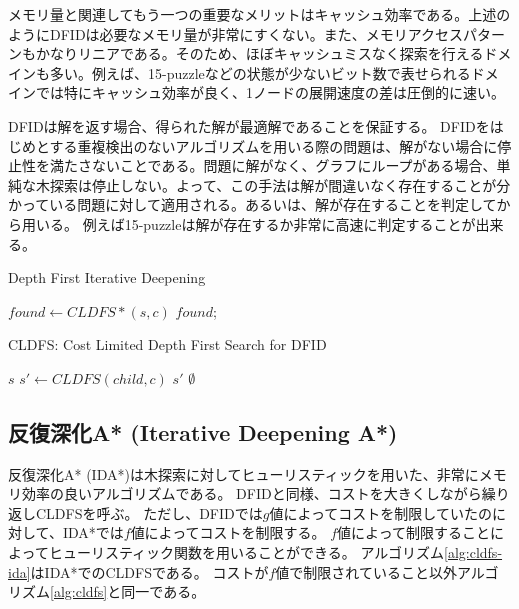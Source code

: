 \documentclass[10pt]{book}
\begin{document}
メモリ量と関連してもう一つの重要なメリットはキャッシュ効率である。上述のようにDFIDは必要なメモリ量が非常にすくない。また、メモリアクセスパターンもかなりリニアである。そのため、ほぼキャッシュミスなく探索を行えるドメインも多い。例えば、15-puzzleなどの状態が少ないビット数で表せられるドメインでは特にキャッシュ効率が良く、1ノードの展開速度の差は圧倒的に速い\cite{korf:85a}。

DFIDは解を返す場合、得られた解が最適解であることを保証する。
DFIDをはじめとする重複検出のないアルゴリズムを用いる際の問題は、解がない場合に停止性を満たさないことである。問題に解がなく、グラフにループがある場合、単純な木探索は停止しない。よって、この手法は解が間違いなく存在することが分かっている問題に対して適用される。あるいは、解が存在することを判定してから用いる。
例えば15-puzzleは解が存在するか非常に高速に判定することが出来る。

\begin{algorithm}
\caption{Depth First Iterative Deepening}
\label{alg:depth-first-iterative-deepening}
	 {
		$found \leftarrow CLDFS*(s, c)$\;
		 {
			\Return $found$;
		}
	}
\end{algorithm}

\begin{algorithm}
\caption{CLDFS: Cost Limited Depth First Search for DFID}
\label{alg:cldfs}
	 {
		\Return $s$\;
	}
	 {
		 {
			$s' \leftarrow CLDFS(child, c)$
			 {
				\Return $s'$
			}
		}
	}
	\Return $\emptyset$\;
\end{algorithm}


\subsection{反復深化A* (Iterative Deepening A*)}
\label{sec:iterative-deepening-astar}


反復深化A* (IDA*)は木探索に対してヒューリスティックを用いた、非常にメモリ効率の良いアルゴリズムである\cite{korf:85a}。
DFIDと同様、コストを大きくしながら繰り返しCLDFSを呼ぶ。
ただし、DFIDでは$g$値によってコストを制限していたのに対して、IDA*では$f$値によってコストを制限する。
$f$値によって制限することによってヒューリスティック関数を用いることができる。
アルゴリズム\ref{alg:cldfs-ida}はIDA*でのCLDFSである。
コストが$f$値で制限されていること以外アルゴリズム\ref{alg:cldfs}と同一である。
\end{document}
